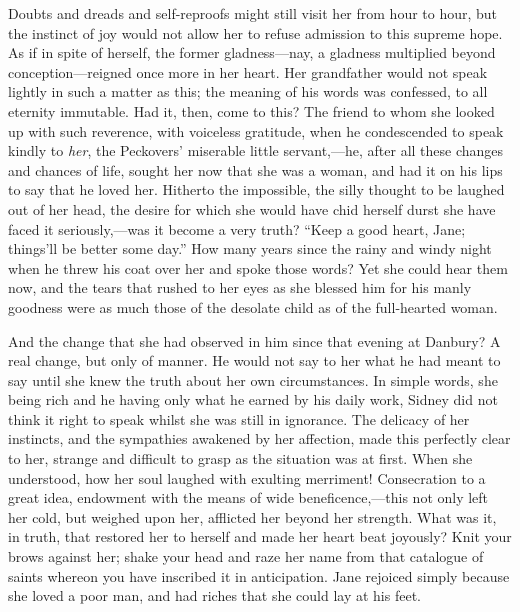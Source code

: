Doubts and dreads and self-reproofs might still visit her from hour to
hour, but the instinct of joy would not allow her to refuse admission to
this supreme hope. As if in spite of herself, the former gladness---nay,
a gladness multiplied beyond conception---reigned once more in her
heart. Her grandfather would not speak lightly in such a matter as this;
the meaning of his words was confessed, to all eternity immutable. Had
it, then, come to this? The friend to whom she looked up with such
reverence, with voiceless gratitude, when he condescended to speak
kindly to \emph{her}, the Peckovers' miserable little servant,---he,
after all these changes and chances of life, sought her now that she was
a woman, and had it on his lips to say that he loved her. Hitherto the
impossible, the silly thought to be laughed out of her head, the desire
for which she would have chid herself durst she
{\protect\hypertarget{255}{}{}}have faced it seriously,---was it become
a very truth? ``Keep a good heart, Jane; things'll be better some day.''
How many years since the rainy and windy night when he threw his coat
over her and spoke those words? Yet she could hear them now, and the
tears that rushed to her eyes as she blessed him for his manly goodness
were as much those of the desolate child as of the full-hearted woman.

And the change that she had observed in him since that evening at
Danbury? A real change, but only of manner. He would not say to her what
he had meant to say until she knew the truth about her own
circumstances. In simple words, she being rich and he having only what
he earned by his daily work, Sidney did not think it right to speak
whilst she was still in ignorance. The delicacy of her instincts, and
the sympathies awakened by her affection, made this perfectly clear to
her, strange and difficult to grasp as the situation was at first. When
she understood, how her soul laughed with exulting merriment!
Consecration to a great {\protect\hypertarget{256}{}{}}idea, endowment
with the means of wide beneficence,---this not only left her cold, but
weighed upon her, afflicted her beyond her strength. What was it, in
truth, that restored her to herself and made her heart beat joyously?
Knit your brows against her; shake your head and raze her name from that
catalogue of saints whereon you have inscribed it in anticipation. Jane
rejoiced simply because she loved a poor man, and had riches that she
could lay at his feet.

